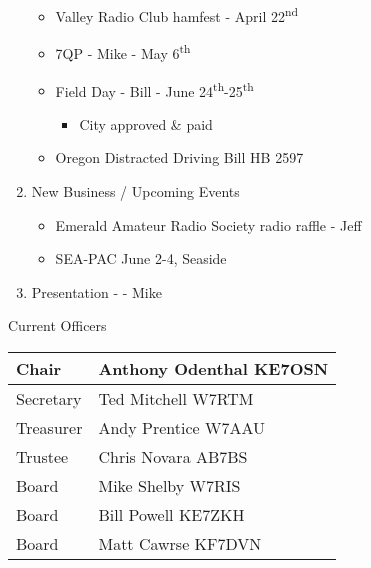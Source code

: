 \documentclass[letter,11pt]{extarticle}
\begin{document}
\begin{enumerate}
			\begin{itemize}
				\item Valley Radio Club hamfest - April 22\textsuperscript{nd}
				\item 7QP - Mike - May 6\textsuperscript{th}
				\item Field Day - Bill - June 24\textsuperscript{th}-25\textsuperscript{th}
					\begin{itemize}
						\item City approved \& paid
					\end{itemize}
				\item Oregon Distracted Driving Bill HB 2597
			\end{itemize}
		\item  New Business / Upcoming Events
			\begin{itemize}
				\item Emerald Amateur Radio Society radio raffle - Jeff
				\item SEA-PAC June 2-4, Seaside
			\end{itemize}
		\item  Presentation -  - Mike
	\end{enumerate}

\newpage

	Current Officers \\
	\begin{tabular}{|l|l|} \hline
		Chair & Anthony Odenthal KE7OSN \\ \hline
		Secretary & Ted Mitchell W7RTM \\ \hline
		Treasurer & Andy Prentice W7AAU \\ \hline
		Trustee & Chris Novara AB7BS \\ \hline
		Board & Mike Shelby W7RIS \\ \hline
		Board & Bill Powell KE7ZKH \\ \hline
		Board & Matt Cawrse KF7DVN \\ \hline
	\end{tabular}
	
	\subsection*{}
\end{document}
